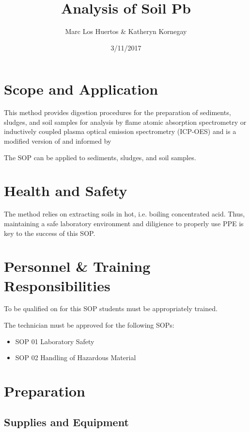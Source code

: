 \documentclass[12pt]{../SOP3_alpha}
\title{Analysis of Soil Pb}
\date{3/11/2017}
\author{Marc Los Huertos \& Katheryn Kornegay}
\begin{document}


\maketitle

\section{Scope and Application}

\NP This method provides digestion procedures for the preparation of sediments, sludges, and soil samples for analysis by flame atomic absorption spectrometry or inductively coupled plasma optical emission spectrometry (ICP-OES) and is a modified version of \cite{EPA3050B} and informed by \cite{pena2011comparative, guven2011comparison} 

\NP The SOP can be applied to sediments, sludges, and soil samples.

\tableofcontents

\newpage

\section{Health and Safety}

\NP The method relies on extracting soils in hot, i.e. boiling concentrated acid. Thus, maintaining a safe laboratory environment and diligience to properly use PPE is key to the success of this SOP. 


\section{Personnel \& Training Responsibilities}

\NP To be qualified on for this SOP students must be appropriately trained.

The technician must be approved for the following SOPs:

\begin{itemize}
  \item SOP 01 Laboratory Safety
  \item SOP 02 Handling of Hazardous Material
\end{itemize}


\section{Preparation}

\subsection{Supplies and Equipment}
\end{document}
